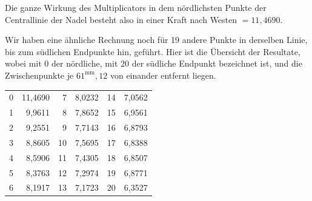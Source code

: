Die ganze Wirkung des Multiplicators in dem nördlichsten Punkte der Centrallinie der Nadel besteht also in einer Kraft nach Westen $=11{,}4690$.

Wir haben eine ähnliche Rechnung noch für 19 andere Punkte in derselben Linie, bis zum südlichen Endpunkte hin, geführt. Hier ist die Übersicht der Resultate, wobei mit 0 der nördliche, mit 20 der südliche Endpunkt bezeichnet ist, und die Zwischenpunkte je $61^{\mathrm{mm}}{,}12$ von einander entfernt liegen.
\begin{center}
\renewcommand{\arraystretch}{1.15}
\begin{tabular}{|r|r||r|r||r|r|}\hline
0 & 11,4690 & 7 & 8,0232 & 14 & 7,0562\\
1 & 9,9611 & 8 & 7,8652 & 15 & 6,9561\\
2 & 9,2551 & 9 & 7,7143 & 16 & 6,8793\\
3 & 8,8605 & 10 & 7,5695 & 17 & 6,8388\\
4 & 8,5906 & 11 & 7,4305 & 18 & 6,8507\\
5 & 8,3763 & 12 & 7,2974 & 19 & 6,8771\\
6 & 8,1917 & 13 & 7,1723 & 20 & 6,3527\\\hline
\end{tabular}
\end{center}
\clearpage\endgroup
